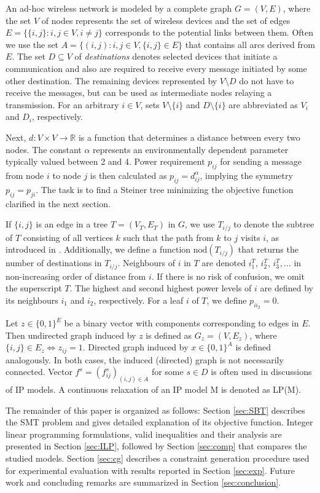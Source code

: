 An ad-hoc wireless network is modeled by a complete graph $G=(V,E)$, where the set $V$ of nodes represents the set of wireless devices and the set of edges $E=\{\{i,j\}:i,j\in V, i\neq j\}$ corresponds to the potential links between them.
Often we use the set $A=\{(i,j):i,j\in V,\{i,j\}\in E\}$ that contains all arcs derived from $E$.
The set $D\subseteq V$ of \emph{destinations} denotes selected devices that initiate a communication and also are required to receive every message initiated by some other destination.
The remaining devices represented by $V\setminus D$ do not have to receive the messages, but can be used as intermediate nodes relaying a transmission.
For an arbitrary $i\in V$, sets $V\setminus \{i\}$ and $D\setminus\{i\}$ are abbreviated as $V_i$ and $D_i$, respectively.
 
Next, $d: V\times V\rightarrow \mathbb{R}$ is a function that determines a distance between every two nodes.
The constant $\alpha$ represents an environmentally dependent parameter typically valued between 2 and 4.
Power requirement $p_{ij}$ for sending a message from node $i$ to node $j$ is then calculated as $p_{ij}=d^{\alpha}_{ij}$, implying the symmetry $p_{ij}=p_{ji}$.
The task is to find a Steiner tree minimizing the objective function clarified in the next section.

If $\{i,j\}$ is an edge in a tree $T=(V_T,E_T)$ in $G$, we use $T_{i/j}$ to denote the subtree of $T$ consisting of all vertices $k$ such that the path from $k$ to $j$ visits $i$, as introduced in \cite{Haugland12Dual}.
Additionally, we define a function $\text{nod}(T_{i/j})$ that returns the number of destinations in $T_{i/j}$.
Neighbours of $i$ in $T$ are denoted $i^T_1$, $i^T_2$, $i^T_3, \dots$ in non-increasing order of distance from $i$.
If there is no risk of confusion, we omit the superscript $T$.
The highest and second highest power levels of $i$ are defined by its neighbours $i_1$ and $i_2$, respectively.
For a leaf $i$ of $T$, we define $p_{ii_2}=0$.

Let $z \in \{0,1\}^E$ be a binary vector with components corresponding to edges in $E$.
Then undirected graph induced by $z$ is defined as  $G_z=(V,E_z)$, where $\{i,j\}\in E_z\Leftrightarrow z_{ij}=1$.
Directed graph induced by $x \in \{0,1\}^A$ is defined analogously.
In both cases, the induced (directed) graph is not necessarily connected.
Vector $f^s=(f^s_{ij})_{(i,j)\in A}$ for some $s\in D$ is often used in discussions of IP models.
A continuous relaxation of an IP model M is denoted as LP(M).

The remainder of this paper is organized as follows: Section \ref{sec:SBT} describes the SMT problem and gives detailed explanation of its objective function.
Integer linear programming formulations, valid inequalities and their analysis are presented in Section \ref{sec:ILP}, followed by Section \ref{sec:comp} that compares the studied models.
Section \ref{sec:cg} describes a constraint generation procedure used for experimental evaluation with results reported in Section \ref{sec:exp}.
Future work and concluding remarks are summarized in Section \ref{sec:conclusion}.


